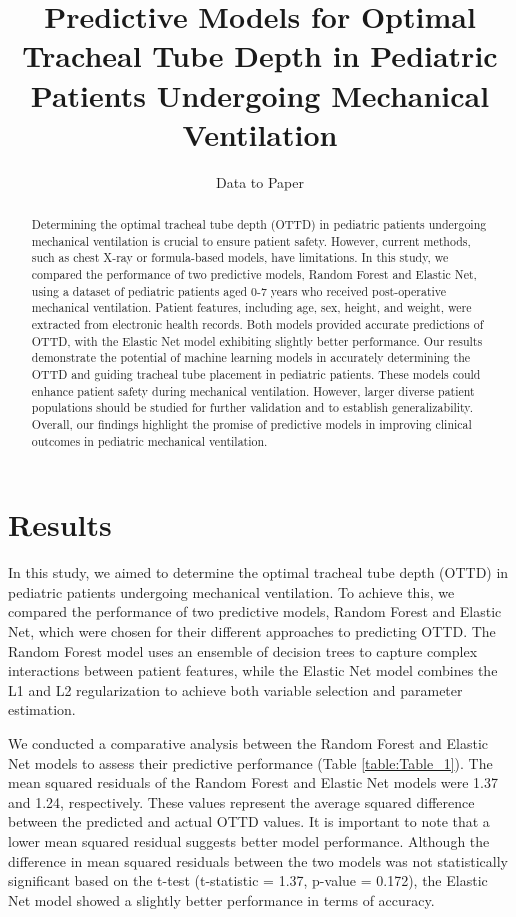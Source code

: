 \documentclass[11pt]{article}
\title{Predictive Models for Optimal Tracheal Tube Depth in Pediatric Patients Undergoing Mechanical Ventilation}
\author{Data to Paper}
\begin{document}
\maketitle
\begin{abstract}
Determining the optimal tracheal tube depth (OTTD) in pediatric patients undergoing mechanical ventilation is crucial to ensure patient safety. However, current methods, such as chest X-ray or formula-based models, have limitations. In this study, we compared the performance of two predictive models, Random Forest and Elastic Net, using a dataset of pediatric patients aged 0-7 years who received post-operative mechanical ventilation. Patient features, including age, sex, height, and weight, were extracted from electronic health records. Both models provided accurate predictions of OTTD, with the Elastic Net model exhibiting slightly better performance. Our results demonstrate the potential of machine learning models in accurately determining the OTTD and guiding tracheal tube placement in pediatric patients. These models could enhance patient safety during mechanical ventilation. However, larger diverse patient populations should be studied for further validation and to establish generalizability. Overall, our findings highlight the promise of predictive models in improving clinical outcomes in pediatric mechanical ventilation.
\end{abstract}
\section*{Results}

In this study, we aimed to determine the optimal tracheal tube depth (OTTD) in pediatric patients undergoing mechanical ventilation. To achieve this, we compared the performance of two predictive models, Random Forest and Elastic Net, which were chosen for their different approaches to predicting OTTD. The Random Forest model uses an ensemble of decision trees to capture complex interactions between patient features, while the Elastic Net model combines the L1 and L2 regularization to achieve both variable selection and parameter estimation.

We conducted a comparative analysis between the Random Forest and Elastic Net models to assess their predictive performance (Table \ref{table:Table_1}). The mean squared residuals of the Random Forest and Elastic Net models were 1.37 and 1.24, respectively. These values represent the average squared difference between the predicted and actual OTTD values. It is important to note that a lower mean squared residual suggests better model performance. Although the difference in mean squared residuals between the two models was not statistically significant based on the t-test (t-statistic = 1.37, p-value = 0.172), the Elastic Net model showed a slightly better performance in terms of accuracy.
\end{document}
